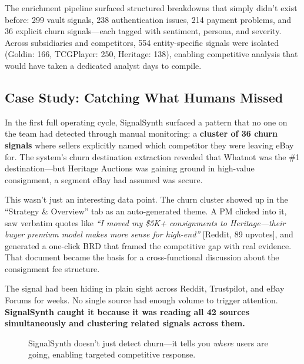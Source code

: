 \documentclass[11pt]{article}
\begin{document}
The enrichment pipeline surfaced structured breakdowns that simply didn't exist before: 299 vault signals, 238 authentication issues, 214 payment problems, and 36 explicit churn signals---each tagged with sentiment, persona, and severity. Across subsidiaries and competitors, 554 entity-specific signals were isolated (Goldin: 166, TCGPlayer: 250, Heritage: 138), enabling competitive analysis that would have taken a dedicated analyst days to compile.

\subsection{Case Study: Catching What Humans Missed}
\label{sec:case}

In the first full operating cycle, SignalSynth surfaced a pattern that no one on the team had detected through manual monitoring: a \textbf{cluster of 36 churn signals} where sellers explicitly named which competitor they were leaving eBay for. The system's churn destination extraction revealed that Whatnot was the \#1 destination---but Heritage Auctions was gaining ground in high-value consignment, a segment eBay had assumed was secure.

This wasn't just an interesting data point. The churn cluster showed up in the ``Strategy \& Overview'' tab as an auto-generated theme. A PM clicked into it, saw verbatim quotes like \textit{``I moved my \$5K+ consignments to Heritage---their buyer premium model makes more sense for high-end''} [Reddit, 89 upvotes], and generated a one-click BRD that framed the competitive gap with real evidence. That document became the basis for a cross-functional discussion about the consignment fee structure.

The signal had been hiding in plain sight across Reddit, Trustpilot, and eBay Forums for weeks. No single source had enough volume to trigger attention. \textbf{SignalSynth caught it because it was reading all 42 sources simultaneously and clustering related signals across them.}

\begin{figure}[h]
\centering
{}
\caption{SignalSynth doesn't just detect churn---it tells you \textit{where} users are going, enabling targeted competitive response.}
\label{fig:churn}
\end{figure}
\end{document}
